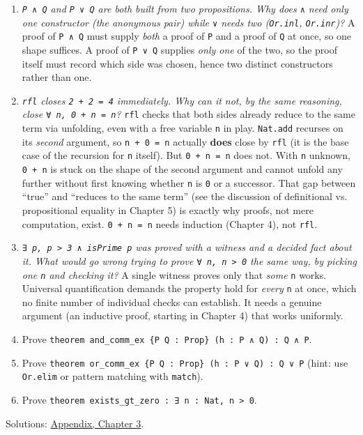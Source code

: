 \begin{enumerate}
\def\labelenumi{\arabic{enumi}.}
\item
  \emph{\texttt{P ∧ Q} and \texttt{P ∨ Q} are both built from two propositions. Why does \texttt{∧} need only one constructor (the anonymous pair) while \texttt{∨} needs two (\texttt{Or.inl}, \texttt{Or.inr})?} A proof of \texttt{P ∧ Q} must supply \emph{both} a proof of \texttt{P} and a proof of \texttt{Q} at once, so one shape suffices. A proof of \texttt{P ∨ Q} supplies \emph{only one} of the two, so the proof itself must record which side was chosen, hence two distinct constructors rather than one.
\item
  \emph{\texttt{rfl} closes \texttt{2 + 2 = 4} immediately. Why can it not, by the same reasoning, close \texttt{∀ n, 0 + n = n}?} \texttt{rfl} checks that both sides already reduce to the same term via unfolding, even with a free variable \texttt{n} in play. \texttt{Nat.add} recurses on its \emph{second} argument, so \texttt{n + 0 = n} actually \textbf{does} close by \texttt{rfl} (it is the base case of the recursion for \texttt{n} itself). But \texttt{0 + n = n} does not. With \texttt{n} unknown, \texttt{0 + n} is stuck on the shape of the second argument and cannot unfold any further without first knowing whether \texttt{n} is \texttt{0} or a successor. That gap between ``true'' and ``reduces to the same term'' (see the discussion of definitional vs. propositional equality in Chapter 5) is exactly why proofs, not mere computation, exist. \texttt{0 + n = n} needs induction (Chapter 4), not \texttt{rfl}.
\item
  \emph{\texttt{∃ p, p > 3 ∧ isPrime p} was proved with a witness and a decided fact about it. What would go wrong trying to prove \texttt{∀ n, n > 0} the same way, by picking one \texttt{n} and checking it?} A single witness proves only that \emph{some} \texttt{n} works. Universal quantification demands the property hold for \emph{every} \texttt{n} at once, which no finite number of individual checks can establish. It needs a genuine argument (an inductive proof, starting in Chapter 4) that works uniformly.
\item
  Prove \texttt{theorem and\_\allowbreak{}comm\_\allowbreak{}ex \{P Q : Prop\} (h : P ∧ Q) : Q ∧ P}.
\item
  Prove \texttt{theorem or\_\allowbreak{}comm\_\allowbreak{}ex \{P Q : Prop\} (h : P ∨ Q) : Q ∨ P} (hint: use \texttt{Or.elim} or pattern matching with \texttt{match}).
\item
  Prove \texttt{theorem exists\_\allowbreak{}gt\_\allowbreak{}zero : ∃ n : Nat, n > 0}.
\end{enumerate}

Solutions: \hyperref[sec:14-appendix-solutions:02-chapter-3:1]{Appendix, Chapter 3}.

